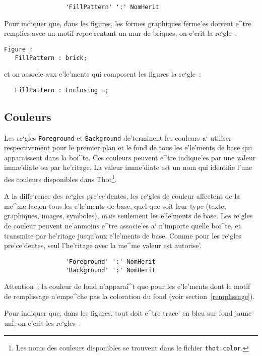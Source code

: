 {\begin{verbatim}
                 'FillPattern' ':' NomHerit
\end{verbatim}

\begin{example}
Pour indiquer que, dans les figures, les formes graphiques ferme'es doivent
e^tre remplies avec un motif repre'sentant un mur de briques, on e'crit la
re`gle~:

\begin{verbatim}
Figure :
   FillPattern : brick;
\end{verbatim}
et on associe aux e'le'ments qui composent les figures la re`gle~:
\begin{verbatim}
   FillPattern : Enclosing =;
\end{verbatim}
\end{example}

\subsection{Couleurs}
\label{couleurs}

Les re`gles {\tt Foreground} et {\tt Background} de'terminent les couleurs
a` utiliser respectivement pour le premier plan et le fond de tous les
e'le'ments de base qui apparaissent dans la boi^te. Ces couleurs peuvent
e^tre indique'es par une valeur imme'diate ou par he'ritage. La valeur
imme'diate est un nom qui identifie l'une des couleurs disponibles dans
Thot\footnote{Les noms des couleurs disponibles se trouvent dans le fichier
{\tt thot.color}.}. 

A la diffe'rence des re`gles pre'ce'dentes, les re`gles de couleur affectent
de la me^me fac,on tous les e'le'ments de base, quel que soit leur type
(texte, graphiques, images, symboles), mais seulement les e'le'ments de base.
Les re`gles de couleur peuvent ne'anmoins e^tre associe'es a` n'importe
quelle boi^te, et transmise par he'ritage jusqu'aux e'le'ments de base.
Comme pour les re`gles pre'ce'dentes, seul l'he'ritage avec la me^me valeur
est autorise'.

\begin{verbatim}
                 'Foreground' ':' NomHerit
                 'Background' ':' NomHerit
\end{verbatim}

Attention~: la couleur de fond n'apparai^t que pour les e'le'ments dont
le motif de remplissage n'empe^che pas la coloration du fond (voir
section~\ref{remplissage}).

\begin{example}
Pour indiquer que, dans les figures, tout doit e^tre trace' en bleu sur fond
jaune uni, on e'crit les re`gles~:


\end{example}}
